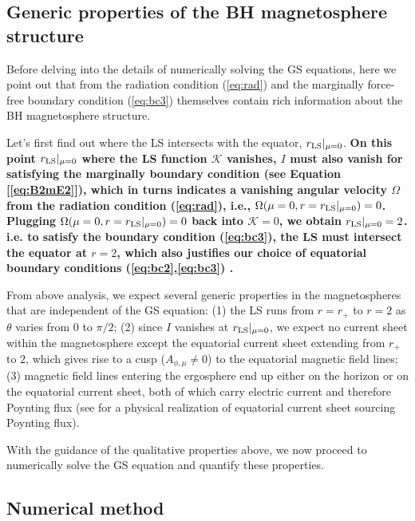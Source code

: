 \documentclass[aps,prd,reprint,nofootinbib, superscriptaddress]{revtex4-1}
\def\Am{A_{\phi,\mu}}
\begin{document}
\subsection{Generic properties of the BH magnetosphere structure}
\label{subsec:features}
Before delving into the details of numerically solving the GS equations,
here we point out that from the radiation condition (\ref{eq:rad}) and the marginally
force-free boundary condition (\ref{eq:bc3})
themselves contain rich information about the BH magnetosphere structure.

Let's first find out where the LS intersects with the equator, $r_{\rm LS}|_{\mu=0}$.
{\bf On this point $r_{\rm LS}|_{\mu=0}$ where the LS function $\mathcal K$ vanishes,
$I$ must also vanish for satisfying the marginally boundary condition (see Equation [\ref{eq:B2mE2}]),
which in turns indicates a vanishing angular velocity $\Omega$ from
the radiation condition (\ref{eq:rad}), i.e., $\Omega(\mu=0, r= r_{\rm LS}|_{\mu=0}) =0$.
Plugging $\Omega(\mu=0, r= r_{\rm LS}|_{\mu=0}) =0$ back into $\mathcal K = 0$,
we obtain $r_{\rm LS}|_{\mu=0}=2$. i.e.
to satisfy the boundary condition (\ref{eq:bc3}), the LS must intersect the equator at $r=2$, which also
justifies our choice of equatorial boundary conditions (\ref{eq:bc2},\ref{eq:bc3}) . }



From above analysis, we expect several generic properties in the magnetospheres that are independent
of the GS equation:
(1) the LS runs from $r=r_+$ to $r=2$ as $\theta$ varies from $0$ to $\pi/2$;
(2) since $I$ vanishes at $r_{\rm LS}|_{\mu=0}$, we expect no current sheet within the magnetosphere except the equatorial current
sheet extending from $r_+$ to $2$, which gives rise to a cusp ($\Am \neq 0$) to the equatorial magnetic field lines;
(3) magnetic field lines entering the ergosphere end up either on the horizon or on the equatorial current sheet,
both of which carry electric current and therefore Poynting flux (see \cite{Punsly1990} for a physical realization of
equatorial current sheet sourcing Poynting flux).

With the guidance of the qualitative properties above, we now proceed to numerically
solve the GS equation and quantify these properties.

\subsection{Numerical method}
\label{subsec:algorithm}
\end{document}
